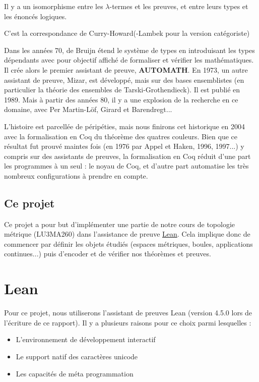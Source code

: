 \documentclass[a4paper, 12pt]{article}
\begin{document}
\begin{center}
    Il y a un isomorphisme entre les $\lambda$-termes et les preuves, et entre leurs types et les énoncés logiques.
\end{center}

C'est la correspondance de Curry-Howard(-Lambek pour la version catégoriste)

Dans les années 70, de Bruijn étend le système de types en introduisant les types dépendants avec pour objectif affiché de formaliser et vérifier les mathématiques. Il crée alors le premier assistant de preuve, \textbf{AUTOMATH}. En 1973, un autre assistant de preuve, Mizar, est développé, mais sur des bases ensemblistes (en particulier la théorie des ensembles de Tarski-Grothendieck). Il est publié en 1989. Mais à partir des années 80, il y a une explosion de la recherche en ce domaine, avec Per Martin-Löf, Girard et Barendregt...

L'histoire est parcellée de péripéties, mais nous finirons cet historique en 2004 avec la formalisation en Coq du théorème des quatres couleurs. Bien que ce résultat fut prouvé maintes fois (en 1976 par Appel et Haken, 1996, 1997...) y compris sur des assistants de preuves, la formalisation en Coq réduit d'une part les programmes à un seul : le noyau de Coq, et d'autre part automatise les très nombreux configurations à prendre en compte.

\subsection{Ce projet}

Ce projet a pour but d'implémenter une partie de notre cours de topologie métrique (LU3MA260) dans l'assistance de preuve \href{https://lean-lang.org/}{Lean}. Cela implique donc de commencer par définir les objets étudiés (espaces métriques, boules, applications continues...) puis d'encoder et de vérifier nos théorèmes et preuves.

\newpage
\section{Lean}

Pour ce projet, nous utiliserons l'assistant de preuves Lean (version 4.5.0 lors de l'écriture de ce rapport). Il y a plusieurs raisons pour ce choix parmi lesquelles :
\begin{itemize}
    \item L'environnement de développement interactif
    \item Le support natif des caractères unicode
    \item Les capacités de méta programmation
\end{itemize}
\end{document}
